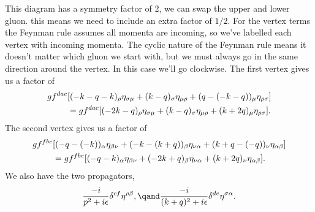 \documentclass[fleqn]{NotesClass}
\newcommand{\minkowskiMetric}{\eta}
\begin{document}
    This diagram has a symmetry factor of \(2\), we can swap the upper and lower gluon.
    this means we need to include an extra factor of \(1/2\).
    For the vertex terms the Feynman rule assumes all momenta are incoming, so we've labelled each vertex with incoming momenta.
    The cyclic nature of the Feynman rule means it doesn't matter which gluon we start with, but we must always go in the same direction around the vertex.
    In this case we'll go clockwise.
    The first vertex gives us a factor of
    \begin{align}
        gf^{dac}&[(-k - q - k)_\rho\minkowskiMetric_{\sigma\mu} + (k - q)_{\sigma}\minkowskiMetric_{\mu\rho} + (q - (- k - q))_{\mu}\minkowskiMetric_{\rho\sigma}] \notag\\
        &= gf^{dac}[(-2k - q)_\rho\minkowskiMetric_{\sigma\mu} + (k - q)_\sigma\minkowskiMetric_{\mu\rho} + (k + 2q)_\mu\minkowskiMetric_{\rho\sigma}].
    \end{align}
    The second vertex gives us a factor of
    \begin{align}
        gf^{fbe}&[(-q - (-k))_\alpha\minkowskiMetric_{\beta\nu} + (-k - (k + q))_{\beta}\minkowskiMetric_{\nu\alpha} + (k + q - (-q))_{\nu}\minkowskiMetric_{\alpha\beta}] \notag\\
        &= gf^{fbe}[(-q - k)_\alpha\minkowskiMetric_{\beta\nu} + (-2k + q)_\beta\minkowskiMetric_{\nu\alpha} + (k + 2q)_\nu\minkowskiMetric_{\alpha\beta}].
    \end{align}
    We also have the two propagators,
    \begin{equation}
        \frac{-i}{p^2 + i\epsilon}\delta^{cf}\minkowskiMetric^{\rho\beta}, \qand \frac{-i}{(k + q)^2 + i\epsilon}\delta^{de}\minkowskiMetric^{\sigma\alpha}.
    \end{equation}
    
\end{document}
